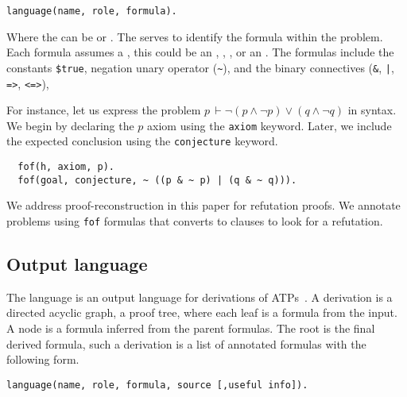\documentclass[../main.tex]{subfiles}
\begin{document}
\begin{verbatim}
language(name, role, formula).
\end{verbatim}

Where the  can be  or . The 
serves to identify the formula within the problem. Each formula
assumes a , this could be an ,
, ,  or an .
The formulas include the constants \verb!$true!, negation unary operator (\verb!~!), and the binary connectives (\verb!&!, \verb!|!, \verb!=>!, \verb!<=>!),

\begin{myexample}
For instance, let us express the problem
$p\, \vdash \neg (p \wedge \neg p) ∨ (q \wedge \neg q)$
in \TPTP syntax. We begin by declaring the $p$ axiom using the \verb!axiom!
keyword. Later, we include the expected conclusion using the
\verb!conjecture! keyword.

  \begin{verbatim}
  fof(h, axiom, p).
  fof(goal, conjecture, ~ ((p & ~ p) | (q & ~ q))).
  \end{verbatim}

\end{myexample}

\begin{remark}
We address proof-reconstruction in this paper for refutation proofs.
We annotate  problems using \verb!fof! formulas that
\Metis converts to  clauses to look for a refutation.
\end{remark}

\subsection{Output language}
\label{ssec:output-language}

The \TSTP language is an output language for derivations of
ATPs~\cite{Sutcliffe-Schulz-Claessen-VanGelder-2006,Sicard-Ramirez2016}.
A \TSTP derivation is a directed acyclic graph, a proof tree,
where each leaf is a formula from the \TPTP input. A node is a formula
inferred from the parent formulas. The root is the final derived formula,
such a derivation is a list of annotated formulas with the following form.

\begin{verbatim}
language(name, role, formula, source [,useful info]).
\end{verbatim}
\end{document}
